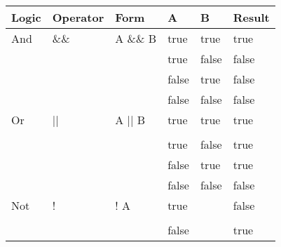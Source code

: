 \documentclass[
  11pt, %
  xcolor=dvipsnames
]{beamer}
\begin{document}
\begin{frame}[fragile]


	\begin{columns}[c]
		\begin{column}{0.9\textwidth}

			\begin{table}
				\begin{tabular}{l l l l l l}
					\toprule
					Logic & Operator & Form     & A     & B     & Result \\
					\midrule
					And   & \&\&     & A \&\& B & true  & true  & true   \\
					      &          &          & true  & false & false  \\
					      &          &          & false & true  & false  \\
					      &          &          & false & false & false  \\
					Or    & ||       & A || B   & true  & true  & true   \\                \\
					      &          &          & true  & false & true   \\
					      &          &          & false & true  & true   \\
					      &          &          & false & false & false  \\
					Not   & !        & ! A      & true  &       & false  \\                                            \\
					      &          &          & false &       & true   \\
					\bottomrule
				\end{tabular}
			\end{table}

		\end{column}
	\end{columns}

\end{frame}
\end{document}
